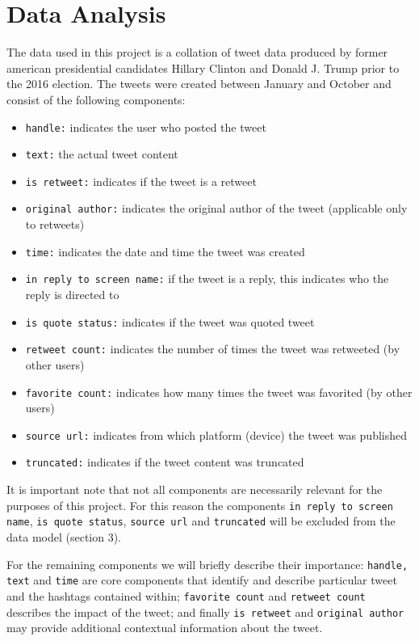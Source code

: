 \documentclass[a4paper, 12pt]{report}
\begin{document}
\section{Data Analysis}
The data used in this project is a collation of tweet data produced by former american presidential candidates Hillary Clinton and Donald J. Trump prior to the 2016 election. The tweets were created between January and October and consist of the following components:
\begin{itemize}
  \item \texttt{handle:} indicates the user who posted the tweet
  \item \texttt{text:} the actual tweet content
  \item \texttt{is retweet:} indicates if the tweet is a retweet
  \item \texttt{original author:} indicates the original author of the tweet (applicable only to retweets)

  \item \texttt{time:} indicates the date and time the tweet was created
  \item \texttt{in reply to screen name:} if the tweet is a reply, this indicates who the reply is directed to

  \item \texttt{is quote status:} indicates if the tweet was quoted tweet
  \item \texttt{retweet count:} indicates the number of times the tweet was retweeted (by other users)

  \item \texttt{favorite count:} indicates how many times the tweet was favorited (by other users)

  \item \texttt{source url:} indicates from which platform (device) the tweet was published

  \item \texttt{truncated:} indicates if the tweet content was truncated
\end{itemize}

It is important note that not all components are necessarily relevant for the purposes of this project. For this reason the components \texttt{in reply to screen name}, \texttt{is quote status}, \texttt{source url} and \texttt{truncated} will be excluded from the data model (section 3).

For the remaining components we will briefly describe their importance: \texttt{handle, text} and \texttt{time} are core components that identify and describe particular tweet and the hashtags contained within; \texttt{favorite count} and \texttt{retweet count} describes the impact of the tweet; and finally \texttt{is retweet} and \texttt{original author} may provide additional contextual information about the tweet.
\end{document}
